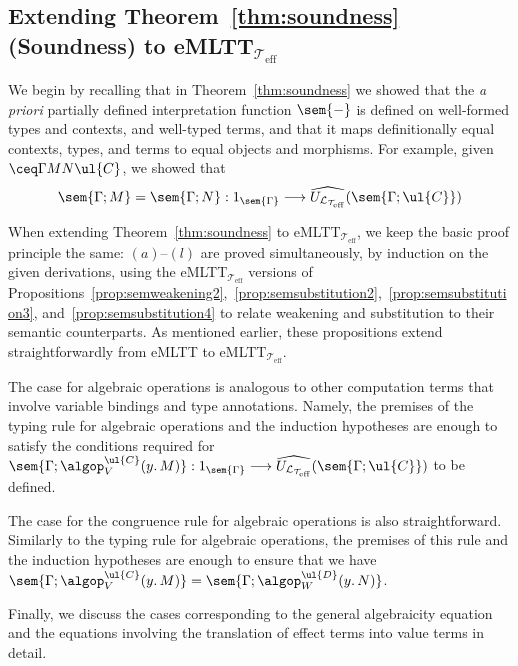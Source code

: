 \subsection*{Extending Theorem~\ref{thm:soundness} (Soundness) to eMLTT$_{\!\mathcal{T}_{\text{eff}}}$}

We begin by recalling that in Theorem~\ref{thm:soundness} we showed that the \emph{a priori} partially defined interpretation function $\sem{-}$  is defined on well-formed types and contexts, and well-typed terms, and that it maps definitionally equal contexts, types, and terms to equal objects and morphisms. For example, given $\ceq \Gamma M N \ul{C}$, we showed that
\[
\sem{\Gamma;M} 
=
\sem{\Gamma;N} 
: 1_{\sem{\Gamma}} \longrightarrow \widehat{U_{\mathcal{L}_{\mathcal{T}_{\text{eff}}}}}(\sem{\Gamma;\ul{C}})
\]


When extending Theorem~\ref{thm:soundness} to eMLTT$_{\mathcal{T}_{\text{eff}}}$, we keep the basic proof principle the same: $(a)$--$(l)$ are proved simultaneously, by induction on the given derivations, using the eMLTT$_{\mathcal{T}_{\text{eff}}}$ versions of Propositions~\ref{prop:semweakening2},~\ref{prop:semsubstitution2},~\ref{prop:semsubstitution3}, and~\ref{prop:semsubstitution4} to relate weakening and substitution to their semantic counterparts. As mentioned earlier, these propositions extend straightforwardly from eMLTT to eMLTT$_{\mathcal{T}_{\text{eff}}}$.

The case for algebraic operations is analogous to other computation terms that involve variable bindings and type annotations. Namely, the premises of the typing rule for algebraic operations and the induction hypotheses are enough to satisfy the conditions required for $\sem{\Gamma;\algop^{\ul{C}}_V(y.\, M)} : 1_{\sem{\Gamma}} \longrightarrow \widehat{U_{\mathcal{L}_{\mathcal{T}_{\text{eff}}}}}(\sem{\Gamma;\ul{C}})$ to be defined. 

The case for the congruence rule for algebraic operations is also straightforward. Similarly to the typing rule for algebraic operations, the premises of this rule and the induction hypotheses are enough to ensure that we have $\sem{\Gamma;\algop^{\ul{C}}_V(y.\, M)} = \sem{\Gamma;\algop^{\ul{D}}_W(y.\, N)}$.

Finally, we discuss the cases corresponding to the general algebraicity equation and the equations involving the translation of effect terms into value terms in detail.

\vspace{0.2cm}

